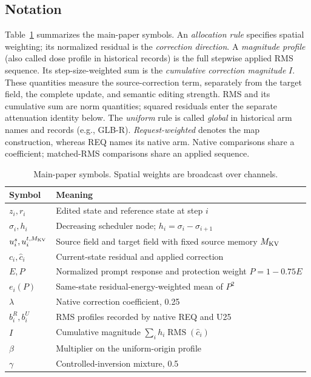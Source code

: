 \documentclass[10pt,doubleanonymous]{ieeeconf}
\newcommand{\RMS}{\operatorname{RMS}}
\begin{document}
\subsection{Notation}
Table~\ref{tab:notation} summarizes the main-paper symbols.
An \emph{allocation rule} specifies spatial weighting; its normalized residual is the \emph{correction direction}. A \emph{magnitude profile} (also called dose profile in historical records) is the full stepwise applied RMS sequence. Its step-size-weighted sum is the \emph{cumulative correction magnitude} $I$. These quantities measure the source-correction term, separately from the target field, the complete update, and semantic editing strength. RMS and its cumulative sum are norm quantities; squared residuals enter the separate attenuation identity below. The \emph{uniform} rule is called \emph{global} in historical arm names and records (e.g., GLB-R). \emph{Request-weighted} denotes the map construction, whereas REQ names its native arm. Native comparisons share a coefficient; matched-RMS comparisons share an applied sequence.
\begin{table}[!t]
\centering\small
\caption{Main-paper symbols. Spatial weights are broadcast over channels.}
\label{tab:notation}
\begin{tabularx}{\linewidth}{@{}l >{\raggedright\arraybackslash}X@{}}
\toprule
Symbol & Meaning\\
\midrule
$z_i,r_i$ & Edited state and reference state at step $i$\\
$\sigma_i,h_i$ & Decreasing scheduler node; $h_i=\sigma_i-\sigma_{i+1}$\\
$u_i^s,u_i^{t,M_{\rm KV}}$ & Source field and target field with fixed source memory $M_{\rm KV}$\\
$c_i,\widehat c_i$ & Current-state residual and applied correction\\
$E,P$ & Normalized prompt response and protection weight $P=1-0.75E$\\
$e_i(P)$ & Same-state residual-energy-weighted mean of $P^2$\\
$\lambda$ & Native correction coefficient, 0.25\\
$b_i^R,b_i^U$ & RMS profiles recorded by native REQ and U25\\
$I$ & Cumulative magnitude $\sum_i h_i\RMS(\widehat c_i)$\\
$\beta$ & Multiplier on the uniform-origin profile\\
$\gamma$ & Controlled-inversion mixture, 0.5\\
\bottomrule
\end{tabularx}
\end{table}
\end{document}
